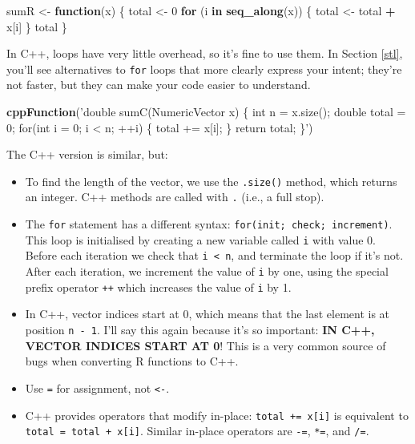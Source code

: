 \documentclass[]{book}
\newenvironment{Shaded}{\begin{snugshade}}{\end{snugshade}}
\newcommand{\ControlFlowTok}[1]{\textcolor[rgb]{0.27,0.27,0.27}{\textbf{#1}}}
\newcommand{\DecValTok}[1]{\textcolor[rgb]{0.06,0.06,0.06}{#1}}
\newcommand{\KeywordTok}[1]{\textcolor[rgb]{0.27,0.27,0.27}{\textbf{#1}}}
\newcommand{\NormalTok}[1]{#1}
\newcommand{\OperatorTok}[1]{\textcolor[rgb]{0.43,0.43,0.43}{\textbf{#1}}}
\newcommand{\StringTok}[1]{\textcolor[rgb]{0.5,0.5,0.5}{#1}}
\begin{document}
\begin{Shaded}
\begin{Highlighting}[]
\NormalTok{sumR <-}\StringTok{ }\ControlFlowTok{function}\NormalTok{(x) \{}
\NormalTok{  total <-}\StringTok{ }\DecValTok{0}
  \ControlFlowTok{for}\NormalTok{ (i }\ControlFlowTok{in} \KeywordTok{seq_along}\NormalTok{(x)) \{}
\NormalTok{    total <-}\StringTok{ }\NormalTok{total }\OperatorTok{+}\StringTok{ }\NormalTok{x[i]}
\NormalTok{  \}}
\NormalTok{  total}
\NormalTok{\}}
\end{Highlighting}
\end{Shaded}

In C++, loops have very little overhead, so it's fine to use them. In Section \ref{stl}, you'll see alternatives to \texttt{for} loops that more clearly express your intent; they're not faster, but they can make your code easier to understand.

\begin{Shaded}
\begin{Highlighting}[]
\KeywordTok{cppFunction}\NormalTok{(}\StringTok{'double sumC(NumericVector x) \{}
\StringTok{  int n = x.size();}
\StringTok{  double total = 0;}
\StringTok{  for(int i = 0; i < n; ++i) \{}
\StringTok{    total += x[i];}
\StringTok{  \}}
\StringTok{  return total;}
\StringTok{\}'}\NormalTok{)}
\end{Highlighting}
\end{Shaded}

The C++ version is similar, but:

\begin{itemize}
\item
  To find the length of the vector, we use the \texttt{.size()} method, which returns
  an integer. C++ methods are called with \texttt{.} (i.e., a full stop).
\item
  The \texttt{for} statement has a different syntax: \texttt{for(init;\ check;\ increment)}.
  This loop is initialised by creating a new variable called \texttt{i} with value 0.
  Before each iteration we check that \texttt{i\ \textless{}\ n}, and terminate the loop if it's
  not. After each iteration, we increment the value of \texttt{i} by one, using the
  special prefix operator \texttt{++} which increases the value of \texttt{i} by 1.
\item
  In C++, vector indices start at 0, which means that the last element is
  at position \texttt{n\ -\ 1}. I'll say this again because it's so important:
  \textbf{IN C++, VECTOR INDICES START AT 0}! This is a very common
  source of bugs when converting R functions to C++.
\item
  Use \texttt{=} for assignment, not \texttt{\textless{}-}.
\item
  C++ provides operators that modify in-place: \texttt{total\ +=\ x{[}i{]}} is equivalent to
  \texttt{total\ =\ total\ +\ x{[}i{]}}. Similar in-place operators are \texttt{-=}, \texttt{*=}, and \texttt{/=}.
\end{itemize}
\end{document}
